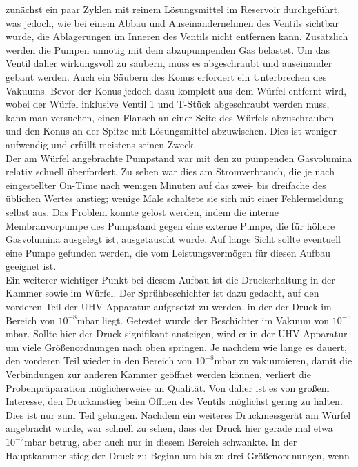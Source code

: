 zunächst ein paar Zyklen mit reinem Lösungsmittel im Reservoir durchgeführt, was jedoch, wie bei
einem Abbau und Auseinandernehmen des Ventils sichtbar wurde, die Ablagerungen im Inneren des
Ventils nicht entfernen kann. Zusätzlich werden die Pumpen unnötig mit dem abzupumpenden Gas
belastet. Um das Ventil daher wirkungsvoll zu säubern, muss es abgeschraubt und auseinander gebaut
werden. Auch ein Säubern des Konus erfordert ein Unterbrechen des Vakuums. Bevor der Konus jedoch
dazu komplett aus dem Würfel entfernt wird, wobei der Würfel inklusive Ventil 1 und T-Stück
abgeschraubt werden muss, kann man versuchen, einen Flansch an einer Seite des Würfels abzuschrauben
und den Konus an der Spitze mit Lösungsmittel abzuwischen. Dies ist weniger aufwendig und
erfüllt meistens seinen Zweck.\\
Der am Würfel angebrachte Pumpstand war mit den zu pumpenden Gasvolumina relativ schnell
überfordert. Zu sehen war dies am Stromverbrauch, die je nach eingestellter On-Time nach
wenigen Minuten auf das zwei- bis dreifache des üblichen Wertes anstieg; wenige Male schaltete sie
sich mit einer Fehlermeldung selbst aus. Das Problem konnte gelöst werden, indem die interne
Membranvorpumpe des Pumpstand gegen eine externe Pumpe, die für höhere Gasvolumina ausgelegt ist,
ausgetauscht wurde.
Auf lange Sicht sollte eventuell eine Pumpe gefunden werden, die vom Leistungsvermögen für diesen
Aufbau geeignet ist.\\
Ein weiterer wichtiger Punkt bei diesem Aufbau ist die Druckerhaltung in der Kammer sowie im Würfel.
Der Sprühbeschichter ist dazu gedacht, auf den vorderen Teil der UHV-Apparatur aufgesetzt zu werden,
in der der Druck im Bereich von $10^{-8}$mbar liegt. Getestet wurde der Beschichter im Vakuum von
$10^{-5}$mbar. Sollte hier der Druck signifikant ansteigen, wird er in der UHV-Apparatur um viele
Größenordnungen nach oben springen. Je nachdem wie lange es dauert, den vorderen Teil wieder in den
Bereich von $10^{-8}$mbar zu vakuumieren, damit die Verbindungen zur anderen Kammer geöffnet werden
können, verliert die Probenpräparation möglicherweise an Qualität. Von daher ist es von großem
Interesse, den Druckanstieg beim Öffnen des Ventils möglichst gering zu halten.\\
Dies ist nur zum Teil gelungen. Nachdem ein weiteres Druckmessgerät am Würfel angebracht wurde, war
schnell zu sehen, dass der Druck hier gerade mal etwa $10^{-2}$mbar betrug, aber auch nur in diesem
Bereich schwankte. In der Hauptkammer stieg der Druck zu Beginn um bis zu drei Größenordnungen, wenn
